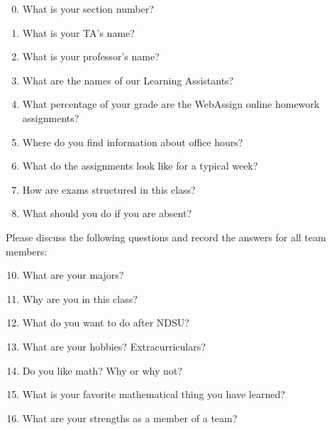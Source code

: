 \documentclass[12pt]{article}
\begin{document}
\begin{enumerate}
\setcounter{enumi}{-1}
\item What is your section number?
\vfill

\item What is your TA's name?
\vfill

\item What is your professor's name?
\vfill

\item What are the names of our Learning Assistants?
\vfill

\item What percentage of your grade are the WebAssign online homework assignments?
\vfill

\item Where do you find information about office hours?
\vfill

\item What do the assignments look like for a typical week?
\vfill
\vfill

\item How are exams structured in this class?
\vfill
\vfill
\item What should you do if you are absent?
\vfill
\vfill
\end{enumerate}
\newpage
Please discuss the following questions and record the answers for all team members:
\begin{enumerate}
\setcounter{enumi}{9}
\item What are your majors?
\vfill
\item Why are you in this class?
\vfill
\item What do you want to do after NDSU?
\vfill
\item What are your hobbies?  Extracurriculars?
\vfill
\item Do you like math?  Why or why not?
\vfill
\item What is your favorite mathematical thing you have learned?
\vfill
\item What are your strengths as a member of a team?
\vfill
%
\end{enumerate}
\end{document}
